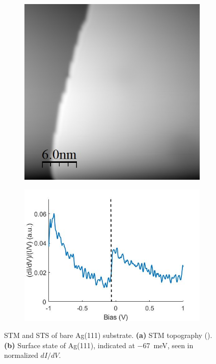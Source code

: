 \begin{figure} [H]
    \centering
    \begin{subfigure}[t]{0.44\textwidth}
    \includegraphics[width=\textwidth]{pictures/ag111_1V_10pA.jpg}
    \caption{}
    \end{subfigure}
    \hfill
    \begin{subfigure}[t]{0.53\textwidth}
        \includegraphics[width=\textwidth]{pictures/ag111_surface_state.jpg}
        \caption{}

    \end{subfigure}
    
    \caption{STM and STS of bare Ag(111) substrate. \textbf{(a)} STM topography (). \textbf{(b)} Surface state of Ag(111), indicated at \SI{-67}{meV}, seen in normalized $dI/dV$.}
    
    \label{fig:expsetup:Ag111}
\end{figure}



